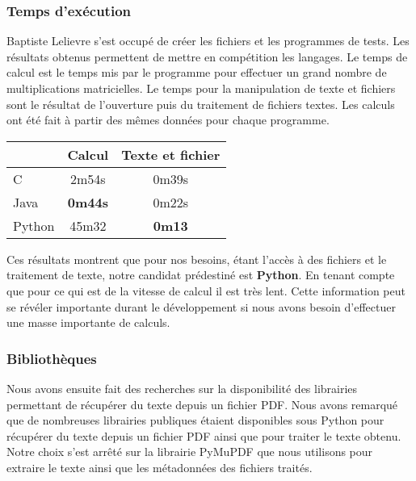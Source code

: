\documentclass[12pt, final]{article}
\begin{document}
            \subsubsection{Temps d'exécution}
            Baptiste Lelievre s'est occupé de créer les fichiers et les programmes de tests. Les résultats obtenus permettent de mettre en compétition les langages. Le temps de calcul est le temps mis par le programme pour effectuer un grand nombre de multiplications matricielles. Le temps pour la manipulation de texte et fichiers sont le résultat de l'ouverture puis du traitement de fichiers textes. Les calculs ont été fait à partir des mêmes données pour chaque programme.
            \begin{center}
                \begin{tabular}{|l|c|c|}
                  \hline  & Calcul & Texte et fichier \\
                  \hline C & 2m54s & 0m39s \\
                  \hline Java & \textbf{0m44s} & 0m22s \\
                  \hline Python & 45m32 & \textbf{0m13} \\
                  \hline
                \end{tabular}
            \end{center}
            Ces résultats montrent que pour nos besoins, étant l'accès à des fichiers et le traitement de texte, notre candidat prédestiné est \textbf{Python}. En tenant compte que pour ce qui est de la vitesse de calcul il est très lent. Cette information peut se révéler importante durant le développement si nous avons besoin d'effectuer une masse importante de calculs.
            
            \subsubsection{Bibliothèques}
            Nous avons ensuite fait des recherches sur la disponibilité des librairies permettant de récupérer du texte depuis un fichier PDF. Nous avons remarqué que de nombreuses librairies publiques étaient disponibles sous Python pour récupérer du texte depuis un fichier PDF ainsi que pour traiter le texte obtenu.\newline
            Notre choix s'est arrêté sur la librairie PyMuPDF que nous utilisons pour extraire le texte ainsi que les métadonnées des fichiers traités.
            
\end{document}
